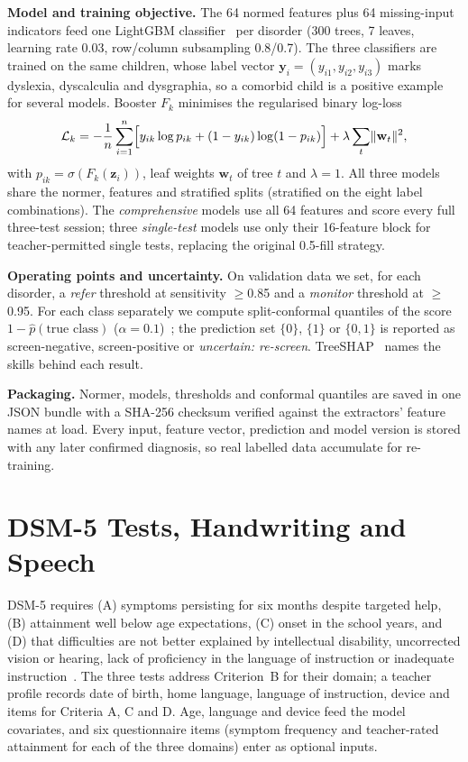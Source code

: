 \documentclass[conference]{IEEEtran}
\begin{document}
\textbf{Model and training objective.} The 64 normed features plus 64 missing-input indicators feed one LightGBM classifier~\cite{ke2017} per disorder (300 trees, 7 leaves, learning rate 0.03, row/column subsampling 0.8/0.7). The three classifiers are trained on the same children, whose label vector $\mathbf y_i=(y_{i1},y_{i2},y_{i3})$ marks dyslexia, dyscalculia and dysgraphia, so a comorbid child is a positive example for several models. Booster $F_k$ minimises the regularised binary log-loss
\begin{equation}
\mathcal L_k=-\frac1n\sum_{i=1}^{n}\Bigl[y_{ik}\log p_{ik}+(1-y_{ik})\log(1-p_{ik})\Bigr]+\lambda\sum_{t}\lVert \mathbf w_t\rVert^2,
\end{equation}
with $p_{ik}=\sigma(F_k(\mathbf z_i))$, leaf weights $\mathbf w_t$ of tree $t$ and $\lambda{=}1$. All three models share the normer, features and stratified splits (stratified on the eight label combinations). The \emph{comprehensive} models use all 64 features and score every full three-test session; three \emph{single-test} models use only their 16-feature block for teacher-permitted single tests, replacing the original 0.5-fill strategy.

\textbf{Operating points and uncertainty.} On validation data we set, for each disorder, a \emph{refer} threshold at sensitivity $\geq$0.85 and a \emph{monitor} threshold at $\geq$0.95. For each class separately we compute split-conformal quantiles of the score $1-\hat p(\text{true class})$ ($\alpha{=}0.1$)~\cite{angelopoulos2021}; the prediction set $\{0\}$, $\{1\}$ or $\{0,1\}$ is reported as screen-negative, screen-positive or \emph{uncertain: re-screen}. TreeSHAP~\cite{lundberg2020} names the skills behind each result.

\textbf{Packaging.} Normer, models, thresholds and conformal quantiles are saved in one JSON bundle with a SHA-256 checksum verified against the extractors' feature names at load. Every input, feature vector, prediction and model version is stored with any later confirmed diagnosis, so real labelled data accumulate for re-training.

\section{DSM-5 Tests, Handwriting and Speech}\label{sec:dsm5}
DSM-5 requires (A) symptoms persisting for six months despite targeted help, (B) attainment well below age expectations, (C) onset in the school years, and (D) that difficulties are not better explained by intellectual disability, uncorrected vision or hearing, lack of proficiency in the language of instruction or inadequate instruction~\cite{dsm5}. The three tests address Criterion~B for their domain; a teacher profile records date of birth, home language, language of instruction, device and items for Criteria A, C and D. Age, language and device feed the model covariates, and six questionnaire items (symptom frequency and teacher-rated attainment for each of the three domains) enter as optional inputs.
\end{document}
